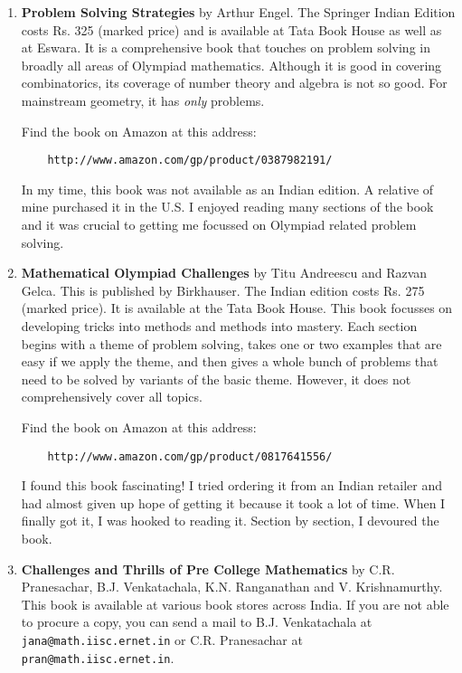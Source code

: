 \documentclass[a4paper]{amsart}
\begin{document}
\begin{enumerate}

\item {\bf Problem Solving Strategies} by Arthur Engel. The Springer Indian Edition costs Rs. 325 (marked price) and is available
  at Tata Book House as well as at Eswara. It is a comprehensive book that touches on problem solving in broadly all areas of
  Olympiad mathematics. Although it is good in covering combinatorics, its coverage of number theory and algebra is not so good.
  For mainstream geometry, it has {\em only} problems.

  Find the book on Amazon at this address:

  \begin{verbatim}
    http://www.amazon.com/gp/product/0387982191/
  \end{verbatim}

  In my time, this book was not available as an Indian edition. A relative of mine purchased it in the U.S. I enjoyed reading
  many sections of the book and it was crucial to getting me focussed on Olympiad related problem solving.

\item {\bf Mathematical Olympiad Challenges} by Titu Andreescu and Razvan Gelca. This is published by Birkhauser. The Indian edition
  costs Rs. 275 (marked price). It is available at the Tata Book House. This book focusses on developing tricks into methods and methods
  into mastery. Each section begins with a theme of problem solving, takes one or two examples
  that are easy if we apply the theme, and then gives a whole bunch of problems that need to be solved by variants of
  the basic theme. However, it does not comprehensively cover all topics. 

  Find the book on Amazon at this address:

  \begin{verbatim}
    http://www.amazon.com/gp/product/0817641556/
  \end{verbatim}

  I found this book fascinating! I tried ordering it from an Indian retailer and had almost given up hope of getting it because
  it took a lot of time. When  I finally got it, I was hooked to reading it. Section by section, I devoured the book.

\item {\bf Challenges and Thrills of Pre College Mathematics} by C.R. Pranesachar, B.J. Venkatachala, K.N. Ranganathan 
  and V. Krishnamurthy. This book is available at various book stores across India. 
  If you are not able to procure a copy, you can send a mail to 
  B.J. Venkatachala at {\tt jana@math.iisc.ernet.in} or C.R. Pranesachar at {\tt pran@math.iisc.ernet.in}.


\end{enumerate}
\end{document}
